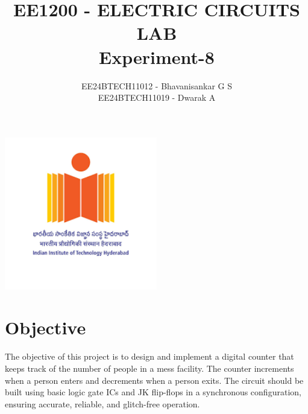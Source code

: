 \documentclass[a4paper,12pt]{article}
\begin{document}

\vspace{3cm}

\title{EE1200 - ELECTRIC CIRCUITS LAB \\ \textbf{Experiment-8} }
\author{EE24BTECH11012 - Bhavanisankar G S \\ EE24BTECH11019 - Dwarak A}
\begin{center}
    \includegraphics[width=0.5\textwidth]{IITH.png} \\ %
    \vspace{1cm} %
    \LARGE
    \end{center}
{\let\newpage\relax\maketitle}

\newpage
\tableofcontents
\newpage

\section{Objective}
The objective of this project is to design and implement a digital counter that keeps track of the number of people in a mess facility. The counter increments when a person enters and decrements when a person exits. The circuit should be built using basic logic gate ICs and JK flip-flops in a synchronous configuration, ensuring accurate, reliable, and glitch-free operation.
\end{document}
